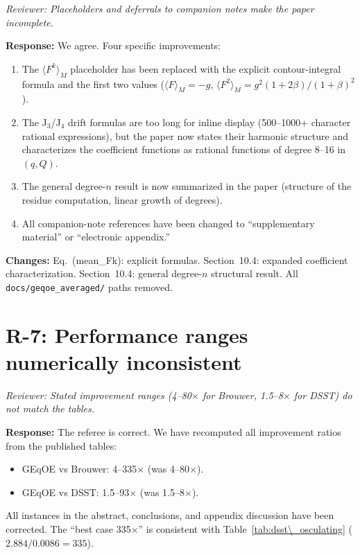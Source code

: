 \documentclass[11pt]{article}
\newcommand{\rev}[1]{\textcolor{revcolor}{\emph{#1}}}
\begin{document}
\rev{Reviewer: Placeholders and deferrals to companion notes make the paper
incomplete.}

\textbf{Response:} We agree. Four specific improvements:
\begin{enumerate}[nosep]
\item The $\langle F^k \rangle_M$ placeholder has been replaced with
  the explicit contour-integral formula and the first two values
  ($\langle F \rangle_M = -g$, $\langle F^2 \rangle_M = g^2(1+2\beta)/(1+\beta)^2$).
\item The J$_3$/J$_4$ drift formulas are too long for inline display
  (500--1000+ character rational expressions), but the paper now states
  their harmonic structure and characterizes the coefficient functions
  as rational functions of degree 8--16 in $(q, Q)$.
\item The general degree-$n$ result is now summarized in the paper
  (structure of the residue computation, linear growth of degrees).
\item All companion-note references have been changed to ``supplementary
  material'' or ``electronic appendix.''
\end{enumerate}

\textbf{Changes:} Eq.~(mean\_Fk): explicit formulas. Section~10.4:
expanded coefficient characterization. Section~10.4: general degree-$n$
structural result. All \texttt{docs/geqoe\_averaged/} paths removed.

\section*{R-7: Performance ranges numerically inconsistent}

\rev{Reviewer: Stated improvement ranges (4--80$\times$ for Brouwer,
1.5--8$\times$ for DSST) do not match the tables.}

\textbf{Response:} The referee is correct. We have recomputed all
improvement ratios from the published tables:
\begin{itemize}[nosep]
\item GEqOE vs Brouwer: 4--335$\times$ (was 4--80$\times$).
\item GEqOE vs DSST: 1.5--93$\times$ (was 1.5--8$\times$).
\end{itemize}
All instances in the abstract, conclusions, and appendix discussion have
been corrected. The ``best case 335$\times$'' is consistent with
Table~\ref{tab:dsst\_osculating} ($2.884/0.0086 = 335$).
\end{document}
